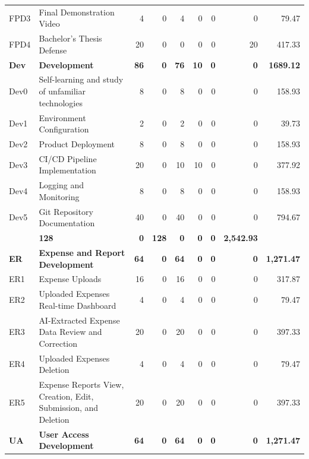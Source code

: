 \begin{longtable}{@{}l p{8.5cm} r r r r r r r@{}}
\rowcolor{gray!05}
FPD3 & Final Demonstration Video & 4 & 0 & 4 & 0 & 0 & 0 & 79.47 \\
\rowcolor{gray!05}
FPD4 & Bachelor's Thesis Defense & 20 & 0 & 0 & 0 & 0 & 20 & 417.33 \\
\rowcolor{gray!20}
\textbf{Dev} & \textbf{Development} & \textbf{86} & \textbf{0} & \textbf{76} & \textbf{10} & \textbf{0} & \textbf{0} & \textbf{1689.12} \\
\rowcolor{gray!05}
Dev0 & Self-learning and study of unfamiliar technologies & 8 & 0 & 8 & 0 & 0 & 0 & 158.93 \\
\rowcolor{gray!05}
Dev1 & Environment Configuration & 2 & 0 & 2 & 0 & 0 & 0 & 39.73 \\
\rowcolor{gray!05}
Dev2 & Product Deployment & 8 & 0 & 8 & 0 & 0 & 0 & 158.93 \\
\rowcolor{gray!05}
Dev3 & CI/CD Pipeline Implementation & 20 & 0 & 10 & 10 & 0 & 0 & 377.92 \\
\rowcolor{gray!05}
Dev4 & Logging and Monitoring & 8 & 0 & 8 & 0 & 0 & 0 & 158.93 \\
\rowcolor{gray!05}
Dev5 & Git Repository Documentation & 40 & 0 & 40 & 0 & 0 & 0 & 794.67 \\
\rowcolor{gray!20}
\multicolumn{2}{l}{\textbf{Frontend and Backend Development}} & \textbf{128} & \textbf{0} & \textbf{128} & \textbf{0} & \textbf{0} & \textbf{0} & \textbf{2,542.93} \\
\rowcolor{gray!10}
\textbf{ER} & \textbf{Expense and Report Development} & \textbf{64} & \textbf{0} & \textbf{64} & \textbf{0} & \textbf{0} & \textbf{0} & \textbf{1,271.47} \\
\rowcolor{gray!05}
ER1 & Expense Uploads & 16 & 0 & 16 & 0 & 0 & 0 & 317.87 \\
\rowcolor{gray!05}
ER2 & Uploaded Expenses Real-time Dashboard & 4 & 0 & 4 & 0 & 0 & 0 & 79.47 \\
\rowcolor{gray!05}
ER3 & AI-Extracted Expense Data Review and Correction & 20 & 0 & 20 & 0 & 0 & 0 & 397.33 \\
\rowcolor{gray!05}
ER4 & Uploaded Expenses Deletion & 4 & 0 & 4 & 0 & 0 & 0 & 79.47 \\
\rowcolor{gray!05}
ER5 & Expense Reports View, Creation, Edit, Submission, and Deletion & 20 & 0 & 20 & 0 & 0 & 0 & 397.33 \\
\rowcolor{gray!10}
\textbf{UA} & \textbf{User Access Development} & \textbf{64} & \textbf{0} & \textbf{64} & \textbf{0} & \textbf{0} & \textbf{0} & \textbf{1,271.47} \\

\end{longtable}
